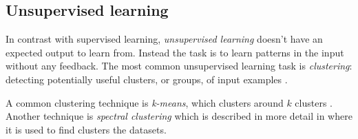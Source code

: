
\subsection{Unsupervised learning}

In contrast with supervised learning, \textit{unsupervised learning} doesn't have an expected output to learn from. Instead the task is to learn patterns in the input without any feedback.  The most common unsupervised learning task is \textit{clustering}: detecting potentially useful clusters, or groups, of input examples \citep{norvigAI}.  

A common clustering technique is \textit{k-means}, which clusters around $k$ clusters \citep{jain1999data}. Another technique is \textit{spectral clustering} which is described in more detail in  where it is used to find clusters the datasets.




